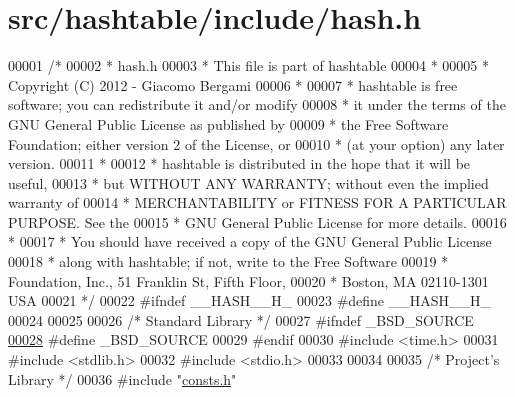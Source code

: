 \hypertarget{hash_8h_source}{
\section{src/hashtable/include/hash.h}
}

\begin{DoxyCode}
00001 \textcolor{comment}{/*}
00002 \textcolor{comment}{ * hash.h}
00003 \textcolor{comment}{ * This file is part of hashtable}
00004 \textcolor{comment}{ *}
00005 \textcolor{comment}{ * Copyright (C) 2012 - Giacomo Bergami}
00006 \textcolor{comment}{ *}
00007 \textcolor{comment}{ * hashtable is free software; you can redistribute it and/or modify}
00008 \textcolor{comment}{ * it under the terms of the GNU General Public License as published by}
00009 \textcolor{comment}{ * the Free Software Foundation; either version 2 of the License, or}
00010 \textcolor{comment}{ * (at your option) any later version.}
00011 \textcolor{comment}{ *}
00012 \textcolor{comment}{ * hashtable is distributed in the hope that it will be useful,}
00013 \textcolor{comment}{ * but WITHOUT ANY WARRANTY; without even the implied warranty of}
00014 \textcolor{comment}{ * MERCHANTABILITY or FITNESS FOR A PARTICULAR PURPOSE.  See the}
00015 \textcolor{comment}{ * GNU General Public License for more details.}
00016 \textcolor{comment}{ *}
00017 \textcolor{comment}{ * You should have received a copy of the GNU General Public License}
00018 \textcolor{comment}{ * along with hashtable; if not, write to the Free Software}
00019 \textcolor{comment}{ * Foundation, Inc., 51 Franklin St, Fifth Floor, }
00020 \textcolor{comment}{ * Boston, MA  02110-1301  USA}
00021 \textcolor{comment}{ */}
00022 \textcolor{preprocessor}{#ifndef \_\_HASH\_\_H\_}
00023 \textcolor{preprocessor}{}\textcolor{preprocessor}{#define \_\_HASH\_\_H\_}
00024 \textcolor{preprocessor}{}
00025 
00026 \textcolor{comment}{/*      Standard Library        */}
00027 \textcolor{preprocessor}{#ifndef         \_BSD\_SOURCE}
\hypertarget{hash_8h_source_l00028}{}\hyperlink{hash_8h_ad3d8a3bd0c0b677acef144f2c2ef6d73}{00028} \textcolor{preprocessor}{}\textcolor{preprocessor}{#define         \_BSD\_SOURCE}
00029 \textcolor{preprocessor}{}\textcolor{preprocessor}{#endif}
00030 \textcolor{preprocessor}{}\textcolor{preprocessor}{#include        <time.h>}
00031 \textcolor{preprocessor}{#include        <stdlib.h>}
00032 \textcolor{preprocessor}{#include        <stdio.h>}
00033 
00034 
00035 \textcolor{comment}{/*      Project's Library       */}
00036 \textcolor{preprocessor}{#include        "\hyperlink{hashtable_2include_2consts_8h}{consts.h}"}

\end{DoxyCode}
